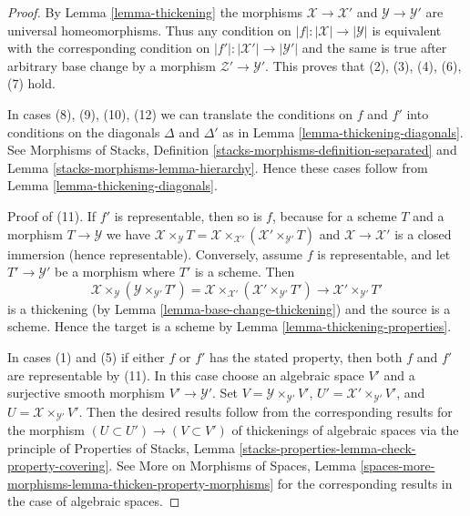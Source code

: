 \documentclass{stacks-project}
\theoremstyle{plain}
\theoremstyle{definition}
\theoremstyle{remark}
\numberwithin{equation}{subsection}
\begin{document}
\begin{proof}
By Lemma \ref{lemma-thickening} the morphisms $\mathcal{X} \to \mathcal{X}'$
and $\mathcal{Y} \to \mathcal{Y}'$ are universal homeomorphisms. Thus any
condition on $|f| : |\mathcal{X}| \to |\mathcal{Y}|$ is equivalent with
the corresponding condition on $|f'| : |\mathcal{X}'| \to |\mathcal{Y}'|$
and the same is true after arbitrary base change by a morphism
$\mathcal{Z}' \to \mathcal{Y}'$. This proves that
(2), (3), (4), (6), (7) hold.

\medskip\noindent
In cases (8), (9), (10), (12) we can translate the conditions on
$f$ and $f'$ into conditions on the diagonals $\Delta$ and $\Delta'$
as in Lemma \ref{lemma-thickening-diagonals}. See
Morphisms of Stacks, Definition \ref{stacks-morphisms-definition-separated} and
Lemma \ref{stacks-morphisms-lemma-hierarchy}.
Hence these cases follow from Lemma \ref{lemma-thickening-diagonals}.

\medskip\noindent
Proof of (11). If $f'$ is representable, then so is $f$, because
for a scheme $T$ and a morphism $T \to \mathcal{Y}$ we have
$\mathcal{X} \times_\mathcal{Y} T =
\mathcal{X} \times_{\mathcal{X}'} (\mathcal{X}' \times_{\mathcal{Y}'} T)$
and $\mathcal{X} \to \mathcal{X}'$ is a closed immersion (hence representable).
Conversely, assume $f$ is representable, and let $T' \to \mathcal{Y}'$
be a morphism where $T'$ is a scheme. Then
$$
\mathcal{X} \times_{\mathcal{Y}}
(\mathcal{Y} \times_{\mathcal{Y}'} T') =
\mathcal{X} \times_{\mathcal{X}'}
(\mathcal{X}' \times_{\mathcal{Y}'} T') \to
\mathcal{X}' \times_{\mathcal{Y}'} T'
$$
is a thickening (by Lemma \ref{lemma-base-change-thickening})
and the source is a scheme. Hence the target is a scheme by
Lemma \ref{lemma-thickening-properties}.

\medskip\noindent
In cases (1) and (5) if either $f$ or $f'$ has the stated property,
then both $f$ and $f'$ are representable by (11). In this case
choose an algebraic space $V'$ and a surjective smooth morphism
$V' \to \mathcal{Y}'$. Set $V = \mathcal{Y} \times_{\mathcal{Y}'} V'$,
$U' = \mathcal{X}' \times_{\mathcal{Y}'} V'$, and
$U = \mathcal{X} \times_{\mathcal{Y}'} V'$. Then the desired
results follow from the corresponding results for
the morphism $(U \subset U') \to (V \subset V')$ of thickenings
of algebraic spaces via the principle of Properties of Stacks, Lemma
\ref{stacks-properties-lemma-check-property-covering}.
See More on Morphisms of Spaces, Lemma
\ref{spaces-more-morphisms-lemma-thicken-property-morphisms}
for the corresponding results in the case of algebraic spaces.
\end{proof}
\end{document}
